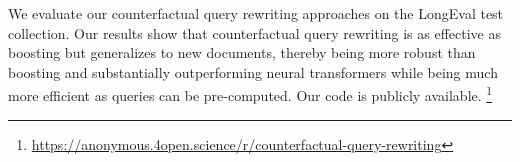 We evaluate our counterfactual query rewriting approaches on the LongEval test collection. Our results show that counterfactual query rewriting is as effective as boosting but generalizes to new documents, thereby being more robust than boosting and substantially outperforming neural transformers while being much more efficient as queries can be pre-computed. Our code is publicly available.%
\footnote{\url{https://anonymous.4open.science/r/counterfactual-query-rewriting}}


